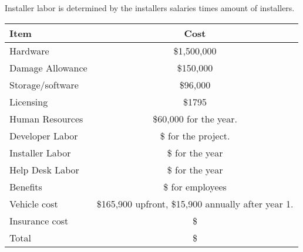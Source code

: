 \documentclass{report}
\begin{document}
Installer labor is determined by the installers salaries times amount of installers.

\begin{tabular}{|l|c|}
\hline
Item & Cost \\
\hline
Hardware & \$1,500,000 \\
\hline
Damage Allowance & \$150,000 \\
\hline
Storage/software & \$96,000 \\
\hline
Licensing & \$1795 \\
\hline
Human Resources & \$60,000 for the year. \\
\hline
Developer Labor & \$ for the project. \\
\hline
Installer Labor & \$ for the year \\
\hline
Help Desk Labor & \$ for the year \\
\hline
Benefits & \$ for employees \\
\hline
Vehicle cost & \$165,900 upfront, \$15,900 annually after year 1. \\
\hline
Insurance cost & \$ \\
Total & \$ \\

\hline
\end{tabular}
\end{document}
